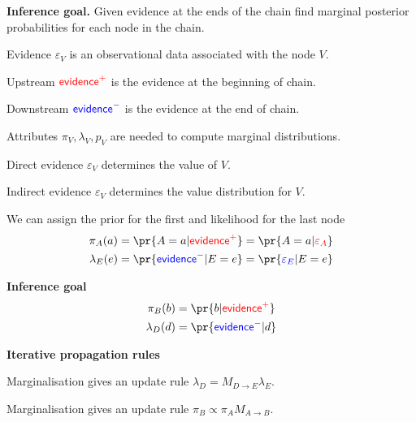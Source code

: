 \documentclass[landscape,footrule]{foils}
\newcommand{\EVPOS}{\textcolor{red}{\mathsf{evidence}^+}}
\newcommand{\EVNEG}{\textcolor{blue}{\mathsf{evidence}^-}}
\begin{document}


\textbf{Inference goal.}
Given evidence at the ends of the chain find marginal posterior probabilities for each node in the chain.
\begin{triangles}
\item Evidence $\varepsilon_V$ is an observational data associated with the node $V$.
\item Upstream $\EVPOS$ is the evidence at the beginning of chain.
\item Downstream $\EVNEG$ is the evidence at the end of chain.
\item Attributes $\pi_V, \lambda_V, p_V$ are needed to compute marginal distributions. 
\end{triangles}



\vspace*{-0.5cm}

\begin{triangles}
\item Direct evidence $\varepsilon_V$ determines the value of $V$.
\item Indirect evidence $\varepsilon_V$ determines the value distribution for $V$. 
\item We can assign the prior for the first and likelihood for the last node
\begin{align*}
\pi_A(a)&=\pr{A=a|\EVPOS}=\pr{A=a|\textcolor{red}{\varepsilon_A}}\\
\lambda_E(e)&=\pr{\EVNEG|E=e}=\pr{\textcolor{blue}{\varepsilon_E}|E=e}
\end{align*}
\end{triangles}



 

\vspace*{-0.0cm}
\textbf{Inference goal}
\begin{align*}
\pi_B(b)&=\pr{b|\EVPOS}\\
\lambda_D(d)&=\pr{\EVNEG|d}
\end{align*}\vspace*{-1.5cm}


\textbf{Iterative propagation rules}
\begin{triangles}
\item Marginalisation gives an update rule $\lambda_D=M_{D\to E}\lambda_E$.
\item Marginalisation gives an update rule $\pi_B\propto \pi_A M_{A\to B}$.

\end{triangles}
\end{document}
